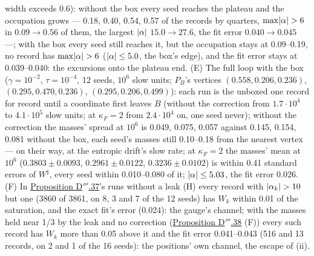 \begin{sloppypar}
width exceeds 0.6): without the box every seed reaches the plateau and the occupation grows --- 0.18, 0.40, 0.54, 0.57
of the records by quarters, $\max\lvert \alpha\rvert > 6$ in $0.09\to0.56$ of them, the largest $\lvert \alpha\rvert$
$15.0\to27.6$, the fit error $0.040\to0.045$ ---; with the box every seed still reaches it, but the occupation stays
at 0.09--0.19, no record has $\max\lvert \alpha\rvert > 6$ ($\lvert \alpha\rvert\le5.0$, the box's edge), and the fit error stays at
0.039--0.040: the excursions onto the plateau end. (E) The full loop with the box ($\gamma = 10^{-2}$,
$\tau = 10^{-4}$, 12 seeds, $10^6$ slow units; $P_B$'s vertices $(0.558, 0.206, 0.236)$, $(0.295, 0.470, 0.236)$,
$(0.295, 0.206, 0.499)$): each run is the unboxed one record for record until a coordinate first leaves $B$ (without
the correction from $1.7\cdot10^4$ to $4.1\cdot10^5$ slow units; at $\kappa_F = 2$ from $2.4\cdot10^4$ on, one seed
never); without the correction the masses' spread at $10^6$ is 0.049, 0.075, 0.057 against 0.145, 0.154, 0.081
without the box, each seed's masses still 0.10--0.18 from the nearest vertex --- on their way, at the entropic drift's
slow rate; at $\kappa_F = 2$ the masses' mean at $10^6$ ($0.3803\pm0.0093$, $0.2961\pm0.0122$, $0.3236\pm0.0102$) is
within 0.41 standard errors of $W^\sharp$, every seed within 0.010--0.080 of it; $\lvert \alpha\rvert\le5.03$, the fit error
0.026. (F) In \hyperref[res:thmDppp:37]{Proposition D$'''$.37}'s runs without a leak (H) every record with
$\lvert \alpha_k\rvert > 10$ but one (3860 of 3861, on 8, 3 and 7 of the 12 seeds) has $W_k$ within 0.01 of the saturation,
and the exact fit's error (0.024): the gauge's channel; with the masses held near 1/3 by the leak and no correction
(\hyperref[res:thmDppp:38]{Proposition D$'''$.38} (F)) every such record has $W_k$ more than 0.05 above it and the fit
error 0.041--0.043 (516 and 13 records, on 2 and 1 of the 16 seeds): the positions' own channel, the escape of (ii).
\end{sloppypar}

